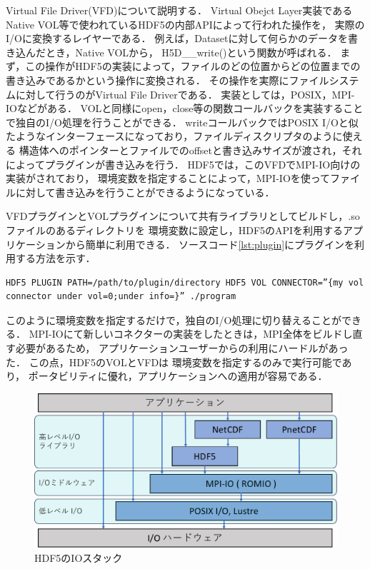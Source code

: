 \documentclass[submit,techrep,noauthor]{ipsj}
\begin{document}
Virtual File Driver(VFD)について説明する．
Virtual Obejct Layer実装であるNative VOL等で使われているHDF5の内部APIによって行われた操作を，
実際のI/Oに変換するレイヤーである．
例えば，Datasetに対して何らかのデータを書き込んだとき，Native VOLから，
H5D\_\_write()という関数が呼ばれる．
まず，この操作がHDF5の実装によって，ファイルのどの位置からどの位置までの書き込みであるかという操作に変換される．
その操作を実際にファイルシステムに対して行うのがVirtual File Driverである．
実装としては，POSIX，MPI-IOなどがある．
VOLと同様にopen，close等の関数コールバックを実装することで独自のI/O処理を行うことができる．
writeコールバックではPOSIX I/Oと似たようなインターフェースになっており，ファイルディスクリプタのように使える
構造体へのポインターとファイルでのoffsetと書き込みサイズが渡され，それによってプラグインが書き込みを行う．
HDF5では，このVFDでMPI-IO向けの実装がされており，
環境変数を指定することによって，MPI-IOを使ってファイルに対して書き込みを行うことができるようになっている．

VFDプラグインとVOLプラグインについて共有ライブラリとしてビルドし，.soファイルのあるディレクトリを
環境変数に設定し，HDF5のAPIを利用するアプリケーションから簡単に利用できる．
ソースコード\ref{lst:plugin}にプラグインを利用する方法を示す．
\begin{lstlisting}[caption=プラグインの利用方法, label=lst:plugin]
HDF5 PLUGIN PATH=/path/to/plugin/directory HDF5 VOL CONNECTOR=”{my vol connector under vol=0;under info=}” ./program
\end{lstlisting}
このように環境変数を指定するだけで，独自のI/O処理に切り替えることができる．
MPI-IOにて新しいコネクターの実装をしたときは，MPI全体をビルドし直す必要があるため，
アプリケーションユーザーからの利用にハードルがあった．
この点，HDF5のVOLとVFDは
環境変数を指定するのみで実行可能であり，
ポータビリティに優れ，アプリケーションへの適用が容易である．


\begin{figure}[t]
	\centering
	\includegraphics[page=7,width=\linewidth]{figure-crop.pdf}
	\caption{HDF5のIOスタック}
	\label{fig:hdf5stack}
\end{figure}
\end{document}
